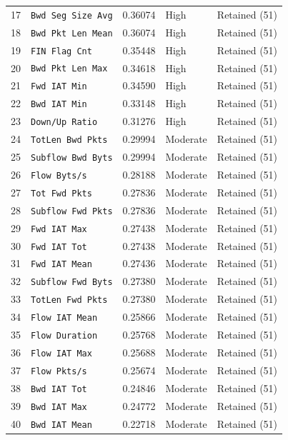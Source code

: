 \documentclass[a4paper,fleqn]{cas-sc}
\begin{document}
\begin{longtable}{@{}r l r l l@{}}
17 & \texttt{Bwd Seg Size Avg}  & 0.36074 & High     & Retained (51) \\
18 & \texttt{Bwd Pkt Len Mean}  & 0.36074 & High     & Retained (51) \\
19 & \texttt{FIN Flag Cnt}      & 0.35448 & High     & Retained (51) \\
20 & \texttt{Bwd Pkt Len Max}   & 0.34618 & High     & Retained (51) \\
21 & \texttt{Fwd IAT Min}       & 0.34590 & High     & Retained (51) \\
22 & \texttt{Bwd IAT Min}       & 0.33148 & High     & Retained (51) \\
23 & \texttt{Down/Up Ratio}     & 0.31276 & High     & Retained (51) \\
24 & \texttt{TotLen Bwd Pkts}   & 0.29994 & Moderate & Retained (51) \\
25 & \texttt{Subflow Bwd Byts}  & 0.29994 & Moderate & Retained (51) \\
26 & \texttt{Flow Byts/s}       & 0.28188 & Moderate & Retained (51) \\
27 & \texttt{Tot Fwd Pkts}      & 0.27836 & Moderate & Retained (51) \\
28 & \texttt{Subflow Fwd Pkts}  & 0.27836 & Moderate & Retained (51) \\
29 & \texttt{Fwd IAT Max}       & 0.27438 & Moderate & Retained (51) \\
30 & \texttt{Fwd IAT Tot}       & 0.27438 & Moderate & Retained (51) \\
31 & \texttt{Fwd IAT Mean}      & 0.27436 & Moderate & Retained (51) \\
32 & \texttt{Subflow Fwd Byts}  & 0.27380 & Moderate & Retained (51) \\
33 & \texttt{TotLen Fwd Pkts}   & 0.27380 & Moderate & Retained (51) \\
34 & \texttt{Flow IAT Mean}     & 0.25866 & Moderate & Retained (51) \\
35 & \texttt{Flow Duration}     & 0.25768 & Moderate & Retained (51) \\
36 & \texttt{Flow IAT Max}      & 0.25688 & Moderate & Retained (51) \\
37 & \texttt{Flow Pkts/s}       & 0.25674 & Moderate & Retained (51) \\
38 & \texttt{Bwd IAT Tot}       & 0.24846 & Moderate & Retained (51) \\
39 & \texttt{Bwd IAT Max}       & 0.24772 & Moderate & Retained (51) \\
40 & \texttt{Bwd IAT Mean}      & 0.22718 & Moderate & Retained (51) \\

\end{longtable}
\end{document}
